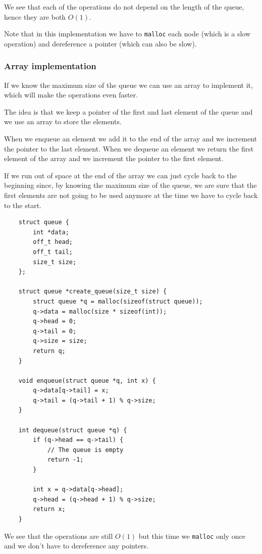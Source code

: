 \documentclass[12pt]{extarticle}
\begin{document}
We see that each of the operations do not depend on the length of the queue, hence they are both $O(1)$.

Note that in this implementation we have to \texttt{malloc} each node (which is a slow operation) and dereference a pointer (which can also be slow).

\subsubsection{Array implementation}

If we know the maximum size of the queue we can use an array to implement it, which will make the operations even faster.

The idea is that we keep a pointer of the first and last element of the queue and we use an array to store the elements.

When we enqueue an element we add it to the end of the array and we increment the pointer to the last element.
When we dequeue an element we return the first element of the array and we increment the pointer to the first element.

If we run out of space at the end of the array we can just cycle back to the beginning since, by knowing the maximum size of the queue, we are sure that the first elements are not going to be used anymore at the time we have to cycle back to the start.

\begin{verbatim}
    struct queue {
        int *data;
        off_t head;
        off_t tail;
        size_t size;
    };

    struct queue *create_queue(size_t size) {
        struct queue *q = malloc(sizeof(struct queue));
        q->data = malloc(size * sizeof(int));
        q->head = 0;
        q->tail = 0;
        q->size = size;
        return q;
    }

    void enqueue(struct queue *q, int x) {
        q->data[q->tail] = x;
        q->tail = (q->tail + 1) % q->size;
    }

    int dequeue(struct queue *q) {
        if (q->head == q->tail) {
            // The queue is empty
            return -1;
        }

        int x = q->data[q->head];
        q->head = (q->head + 1) % q->size;
        return x;
    }
\end{verbatim}

We see that the operations are still $O(1)$ but this time we \texttt{malloc} only once and we don't have to dereference any pointers.
\end{document}
